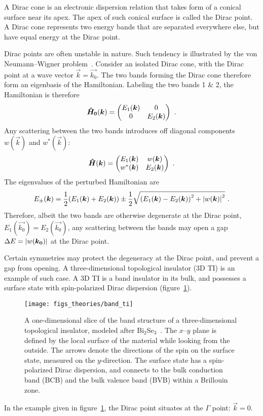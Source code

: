 ﻿A Dirac cone is an electronic dispersion relation that takes form of a conical surface near its apex. The apex of such conical surface is called the Dirac point. A Dirac cone represents two energy bands that are separated everywhere else, but have equal energy at the Dirac point.

Dirac points are often unstable in nature. Such tendency is illustrated by the von Neumann--Wigner problem~\cite{vonNeumann1993, Asano2011}. Consider an isolated Dirac cone, with the Dirac point at a wave vector $\vec{k}=\vec{k_0}$. The two bands forming the Dirac cone therefore form an eigenbasis of the Hamiltonian. Labeling the two bands 1 \& 2, the Hamiltonian is therefore%
\begin{equation}
    \op{H_0}(\vec{k}) = %
        \begin{pmatrix}
            E_1(\vec{k}) & 0\\
            0 & E_2(\vec{k})
        \end{pmatrix}~.
\end{equation}%
Any scattering between the two bands introduces off diagonal components $w(\vec{k})$ and $w^*(\vec{k})$:%
\begin{equation}
    \op{H}(\vec{k}) = %
        \begin{pmatrix}
            E_1(\vec{k}) & w(\vec{k})\\
            w^*(\vec{k}) & E_2(\vec{k})
        \end{pmatrix}~.
\end{equation}%
The eigenvalues of the perturbed Hamiltonian are
\begin{equation}
    E_\pm(\vec{k}) = \frac{1}{2} \qty(E_1(\vec{k}) + E_2(\vec{k})) \pm \frac{1}{2} \sqrt{\qty(E_1(\vec{k}) - E_2(\vec{k}))^2 + \abs{w(\vec{k})}^2}~.
\end{equation}
Therefore, albeit the two bands are otherwise degenerate at the Dirac point, $E_1(\vec{k_0}) = E_2(\vec{k_0})$, any scattering between the bands may open a gap $\Delta{}E = \abs{w(\vec{k_0})}$ at the Dirac point.

Certain symmetries may protect the degeneracy at the Dirac point, and prevent a gap from opening. A three-dimensional topological insulator (3D TI) is an example of such case. A 3D TI is a band insulator in its bulk, and possesses a surface state with spin-polarized Dirac dispersion (figure~\ref{fig:bg_ti}).%
\begin{figure}[ht]%
    \centering%
    \texttt{[image: figs\_theories/band\_ti]}%
    \caption[Band structure of a 3D topological insulator]{\label{fig:bg_ti}A one-dimensional slice of the band structure of a three-dimensional topological insulator, modeled after Bi$_2$Se$_3$~\cite{TI_Qi}. The $x$--$y$ plane is defined by the local surface of the material while looking from the outside. The arrows denote the directions of the spin on the surface state, measured on the $y$-direction. The surface state has a spin-polarized Dirac dispersion, and connects to the bulk conduction band (BCB) and the bulk valence band (BVB) within a Brillouin zone.}%
\end{figure}%

In the example given in figure~\ref{fig:bg_ti}, the Dirac point situates at the $\Gamma$ point: $\vec{k} = 0$.